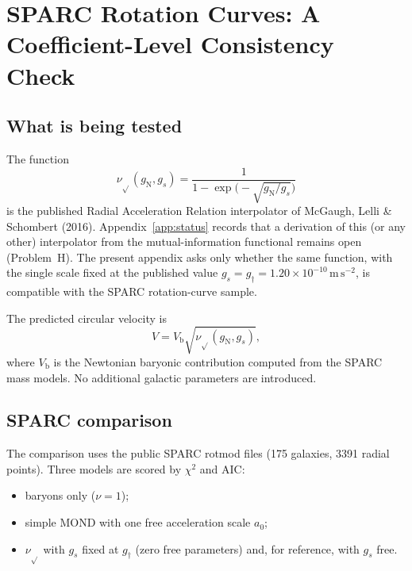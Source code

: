 \chapter{SPARC Rotation Curves: A Coefficient-Level Consistency Check}
\label{app:empirical}

\section{What is being tested}
\label{sec:sparc-what}

The function
\begin{equation}
  \label{eq:appD-nu}
  \nu_{\sqrt{}}(g_{\mathrm{N}},g_s)
  =\frac{1}{1-\exp\bigl(-\sqrt{g_{\mathrm{N}}/g_s}\bigr)}
\end{equation}
is the published Radial Acceleration Relation interpolator of
McGaugh, Lelli \& Schombert (2016). Appendix~\ref{app:status}
records that a derivation of this (or any other) interpolator from
the mutual-information functional remains open (Problem~H). The
present appendix asks only whether the same function, with the
single scale fixed at the published value
\(g_s=g_\dagger=1.20\times10^{-10}\,\mathrm{m\,s^{-2}}\),
is compatible with the SPARC rotation-curve sample.

The predicted circular velocity is
\begin{equation}
  \label{eq:appD-V}
  V=V_{\mathrm{b}}\sqrt{\nu_{\sqrt{}}(g_{\mathrm{N}},g_s)},
\end{equation}
where \(V_{\mathrm{b}}\) is the Newtonian baryonic contribution
computed from the SPARC mass models. No additional galactic
parameters are introduced.

\section{SPARC comparison}
\label{sec:sparc-comparison}

The comparison uses the public SPARC rotmod files
(175 galaxies, 3391 radial points). Three models are scored by
\(\chi^2\) and AIC:

\begin{itemize}
  \item baryons only (\(\nu=1\));
  \item simple MOND with one free acceleration scale \(a_0\);
  \item \(\nu_{\sqrt{}}\) with \(g_s\) fixed at \(g_\dagger\)
        (zero free parameters) and, for reference, with \(g_s\) free.
\end{itemize}

